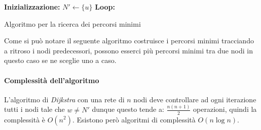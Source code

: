         \begin{algorithm}[H]
            \SetAlgoLined
            \textbf{Inizializzazione:}\;
            $N' \gets \{u\}$ \tcp*[f]{\textcolor{orange}{nodo corrente}} \;
            \textbf{Loop:}\;
            \tcp*[f]{\textcolor{orange}{Il nuovo costo verso $v$ è il costo già noto, oppure il costo minimo verso $w$ più il costo da $w$ a $v$}} \;
            \caption{Algoritmo per la ricerca dei percorsi minimi}
        \end{algorithm}
        Come si può notare il seguente algoritmo costruisce i percorsi minimi tracciando a ritroso i nodi predecessori, possono esserci più percorsi minimi tra due nodi in questo caso se ne sceglie uno a caso.
        \paragraph{Complessità dell'algoritmo} L'algoritmo di \textit{Dijkstra} con una rete di $n$ nodi deve controllare ad ogni iterazione tutti i nodi tale che $w\neq N'$ dunque questo tende a: $ \frac{n(n+1)}2$ operazioni, quindi la complessità è $O(n^2)$. Esistono però algoritmi di complessità $O(n\log n)$. 
